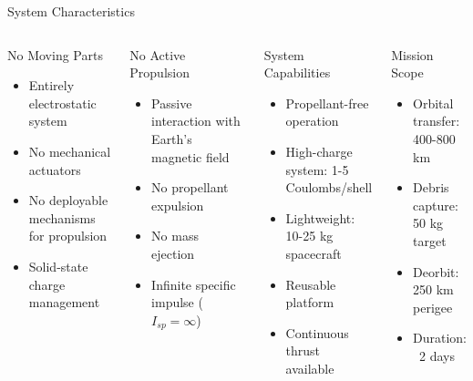 \documentclass[aspectratio=169]{beamer}
\begin{document}
\begin{frame}{System Characteristics}
\begin{columns}[t]
\begin{block}{No Moving Parts}
\begin{itemize}
    \item Entirely electrostatic system
    \item No mechanical actuators
    \item No deployable mechanisms for propulsion
    \item Solid-state charge management
\end{itemize}
\end{block}

\begin{block}{No Active Propulsion}
\begin{itemize}
    \item Passive interaction with Earth's magnetic field
    \item No propellant expulsion
    \item No mass ejection
    \item Infinite specific impulse ($I_{sp} = \infty$)
\end{itemize}
\end{block}

\begin{block}{System Capabilities}
\begin{itemize}
    \item Propellant-free operation
    \item High-charge system: 1-5 Coulombs/shell
    \item Lightweight: 10-25 kg spacecraft
    \item Reusable platform
    \item Continuous thrust available
\end{itemize}
\end{block}

\begin{block}{Mission Scope}
\begin{itemize}
    \item Orbital transfer: 400-800 km
    \item Debris capture: 50 kg target
    \item Deorbit: 250 km perigee
    \item Duration: ~2 days
\end{itemize}
\end{block}
\end{columns}
\end{frame}
\end{document}
